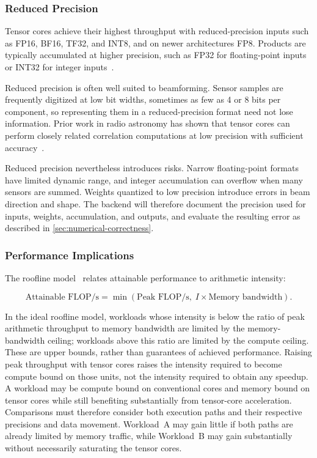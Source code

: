 \subsubsection{Reduced Precision}
\label{sec:reduced-precision}

Tensor cores achieve their highest throughput with reduced-precision inputs such as FP16, BF16, TF32, and INT8, and on newer architectures FP8. Products are typically accumulated at higher precision, such as FP32 for floating-point inputs or INT32 for integer inputs~\cite{cudaProgrammingGuide}.

Reduced precision is often well suited to beamforming. Sensor samples are frequently digitized at low bit widths, sometimes as few as 4 or 8 bits per component, so representing them in a reduced-precision format need not lose information. Prior work in radio astronomy has shown that tensor cores can perform closely related correlation computations at low precision with sufficient accuracy~\cite{romein2021tcc}.

Reduced precision nevertheless introduces risks. Narrow floating-point formats have limited dynamic range, and integer accumulation can overflow when many sensors are summed. Weights quantized to low precision introduce errors in beam direction and shape. The backend will therefore document the precision used for inputs, weights, accumulation, and outputs, and evaluate the resulting error as described in \cref{sec:numerical-correctness}.

\subsubsection{Performance Implications}
\label{sec:performance-implications}

The roofline model~\cite{williams2009roofline} relates attainable performance to arithmetic intensity:

\begin{equation}
  \text{Attainable FLOP/s} = \min\left(\text{Peak FLOP/s},\; I \times \text{Memory bandwidth}\right).
  \label{eq:roofline}
\end{equation}

In the ideal roofline model, workloads whose intensity is below the ratio of peak arithmetic throughput to memory bandwidth are limited by the memory-bandwidth ceiling; workloads above this ratio are limited by the compute ceiling. These are upper bounds, rather than guarantees of achieved performance. Raising peak throughput with tensor cores raises the intensity required to become compute bound on those units, not the intensity required to obtain any speedup. A workload may be compute bound on conventional cores and memory bound on tensor cores while still benefiting substantially from tensor-core acceleration. Comparisons must therefore consider both execution paths and their respective precisions and data movement. Workload~A may gain little if both paths are already limited by memory traffic, while Workload~B may gain substantially without necessarily saturating the tensor cores.

